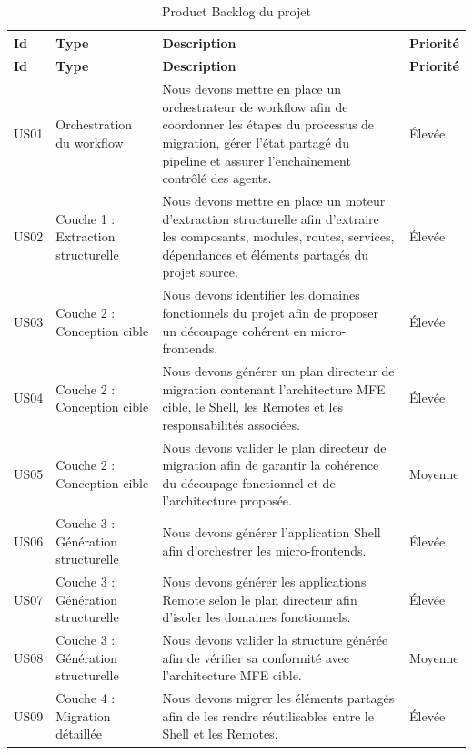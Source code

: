 \setlength{\tabcolsep}{4pt}
\begin{longtable}{|P{1.0cm}|P{2.7cm}|P{6.6cm}|P{2.25cm}|}
\caption{Product Backlog du projet}
\label{tab:product-backlog}\\
\hline
\textbf{Id} & \textbf{Type} & \textbf{Description} & \textbf{Priorité} \\
\hline
\endfirsthead

\hline
\textbf{Id} & \textbf{Type} & \textbf{Description} & \textbf{Priorité} \\
\hline
\endhead

US01 & Orchestration du workflow & Nous devons mettre en place un orchestrateur de workflow afin de coordonner les étapes du processus de migration, gérer l'état partagé du pipeline et assurer l'enchaînement contrôlé des agents. & Élevée \\
\hline
US02 & Couche 1 : Extraction structurelle & Nous devons mettre en place un moteur d'extraction structurelle afin d'extraire les composants, modules, routes, services, dépendances et éléments partagés du projet source. & Élevée \\
\hline
US03 & Couche 2 : Conception cible & Nous devons identifier les domaines fonctionnels du projet afin de proposer un découpage cohérent en micro-frontends. & Élevée \\
\hline
US04 & Couche 2 : Conception cible & Nous devons générer un plan directeur de migration contenant l'architecture MFE cible, le Shell, les Remotes et les responsabilités associées. & Élevée \\
\hline
US05 & Couche 2 : Conception cible & Nous devons valider le plan directeur de migration afin de garantir la cohérence du découpage fonctionnel et de l'architecture proposée. & Moyenne \\
\hline
US06 & Couche 3 : Génération structurelle & Nous devons générer l'application Shell afin d'orchestrer les micro-frontends. & Élevée \\
\hline
US07 & Couche 3 : Génération structurelle & Nous devons générer les applications Remote selon le plan directeur afin d'isoler les domaines fonctionnels. & Élevée \\
\hline
US08 & Couche 3 : Génération structurelle & Nous devons valider la structure générée afin de vérifier sa conformité avec l'architecture MFE cible. & Moyenne \\
\hline
US09 & Couche 4 : Migration détaillée & Nous devons migrer les éléments partagés afin de les rendre réutilisables entre le Shell et les Remotes. & Élevée \\

\end{longtable}
